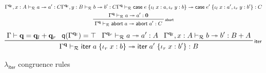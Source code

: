 \documentclass[acmsmall,screen,review]{acmart}
\newcommand{\mc}[1]{\ensuremath{\mathcal{#1}}}
\newcommand{\mb}[1]{\ensuremath{\mathbf{#1}}}
\newcommand{\ms}[1]{\ensuremath{\mathsf{#1}}}
\newcommand{\lto}{:}
\newcommand{\linl}[1]{\iota_l\;{#1}}
\newcommand{\linr}[1]{\iota_r\;{#1}}
\newcommand{\labort}[1]{\ms{abort}\;{#1}}
\newcommand{\caseexpr}[5]{\ms{case}\;#1\;\{\linl{#2} \lto #3, \linr{#4} \lto #5\}}
\newcommand{\liter}[3]{\ms{iter}\;#1\;\{ \linr{#2} \lto #3 \}}
\newcommand{\qsp}[4]{#1 \vdash #2 = #3 + #4}
\newcommand{\rle}[1]{{\scriptsize\textsf{#1}}}
\newcommand{\tref}{\twoheadrightarrow}
\newcommand{\tmle}[5]{#1 \vdash_{#2} #3 \tref #4 : {#5}}
\newcommand{\subiterssa}{\(\lambda_{\ms{iter}}\)}
\newcommand{\alquant}{\ms{q}}
\begin{document}
\begin{figure}
\begin{gather*}
      {\tmle{\Gamma^{\mb{q}_l}, x : A}{\mc{R}}{a}{a'}{C}}
      {\tmle{\Gamma^{\mb{q}_l}, y : B}{\mc{R}}{b}{b'}{C}}
      {\tmle{\Gamma^{\mb{q}}}{\mc{R}}
        {\caseexpr{e}{x}{a}{y}{b}}{\caseexpr{e'}{x}{a'}{y}{b'}}{C}} \\
    \prftree[r]{\rle{abort}}
      {\tmle{\Gamma^{\mb{q}}}{\mc{R}}{a}{a'}{\mb{0}}}
      {\tmle{\Gamma^{\mb{q}}}{\mc{R}}{\labort{a}}{\labort{a'}}{C}}
  \end{gather*}
  \begin{gather*}
    \prftree[r]{\rle{iter}}
      {\qsp{\Gamma}{\mb{q}}{\mb{q}_l}{\mb{q}_r}}
      {\alquant(\Gamma^{\mb{q}_l}) = \top}
      {\tmle{\Gamma^{\mb{q}_r}}{\mc{R}}{a}{a'}{A}}
      {\tmle{\Gamma^{\mb{q}_l}, x : A}{\mc{R}}{b}{b'}{B + A}}
      {\tmle{\Gamma^{\mb{q}}}{\mc{R}}{\liter{a}{x}{b}}{\liter{a'}{x}{b'}}{B}}
  \end{gather*}
  \caption{\subiterssa{} congruence rules}
  \Description{}
  \label{fig:congruence-refinement}
\end{figure}
\end{document}

